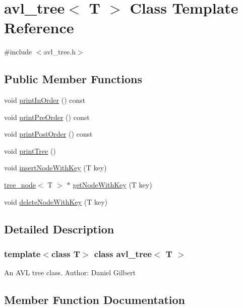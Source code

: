 \hypertarget{classavl__tree}{}\section{avl\+\_\+tree$<$ T $>$ Class Template Reference}
\label{classavl__tree}


{\ttfamily \#include $<$avl\+\_\+tree.\+h$>$}

\subsection*{Public Member Functions}
\begin{DoxyCompactItemize}
\item 
void \hyperlink{classavl__tree_a524ae6ac5d7f7c2399fb758aba84af80}{print\+In\+Order} () const
\item 
void \hyperlink{classavl__tree_ac17fa1e4aa2f0f4b609a7b72c34bd2f6}{print\+Pre\+Order} () const
\item 
void \hyperlink{classavl__tree_a5fb83061648947aeb6b540a5dee7ae13}{print\+Post\+Order} () const
\item 
void \hyperlink{classavl__tree_ae067ad48ed35e1df18fdda1ed83c3d79}{print\+Tree} ()
\item 
void \hyperlink{classavl__tree_afece250225096dba051bd467e89b3657}{insert\+Node\+With\+Key} (T key)
\item 
\hyperlink{classtree__node}{tree\+\_\+node}$<$ T $>$ $\ast$ \hyperlink{classavl__tree_acc15be343ae8c57859902e5e2b55c2a2}{get\+Node\+With\+Key} (T key)
\item 
void \hyperlink{classavl__tree_a2ed74e7f2e93edea90c5867ec127086f}{delete\+Node\+With\+Key} (T key)
\end{DoxyCompactItemize}


\subsection{Detailed Description}
\subsubsection*{template$<$class T$>$\newline
class avl\+\_\+tree$<$ T $>$}

An A\+VL tree class. Author\+: Daniel Gilbert 

\subsection{Member Function Documentation}
\mbox{\label{classavl__tree_a2ed74e7f2e93edea90c5867ec127086f}} 
